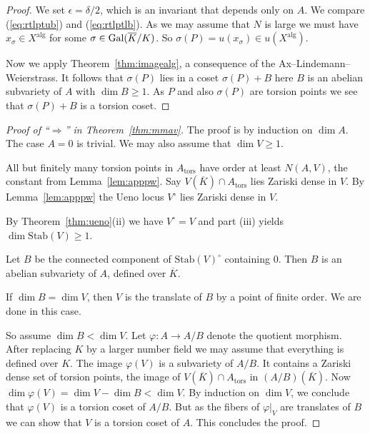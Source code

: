 \begin{proof}
  We set $\epsilon = \delta/2$, which is an invariant that depends only
  on $A$. We compare (\ref{eq:rtlptub}) and (\ref{eq:rtlptlb}). As we
  may assume that $N$ is large we must have $x_\sigma \in
  X^{\mathrm{alg}}$ for some $\sigma\in \mathrm{Gal}(\overline{K}/K)$. 
  So $\sigma(P) = u(x_\sigma)  \in u(X^{\mathrm{alg}})$.

  Now we apply Theorem~\ref{thm:imagealg}, a consequence of the
  Ax--Lindemann--Weierstrass. It follows that $\sigma(P)$ lies in a
  coset $\sigma(P)+B$ here $B$ is an abelian subvariety of $A$ with
  $\dim B\ge 1$. As $P$ and also $\sigma(P)$ are torsion points we see
  that $\sigma(P)+B$ is a torsion coset.
\end{proof}


\begin{proof}[Proof of ``$\Longrightarrow$'' in
  Theorem~\ref{thm:mmav}]
  The proof is by induction on $\dim A$. The case $A=0$ is trivial. 
  We may also assume that $\dim V\ge 1$.

  All but finitely many torsion
  points in $A_{\mathrm{tors}}$ have order at least $N(A,V)$, the
  constant from Lemma~\ref{lem:apppw}.
  Say $V(\overline K)\cap A_{\mathrm{tors}}$ lies Zariski dense in
  $V$. By Lemma~\ref{lem:apppw} 
  the Ueno locus $V^{\circ}$ lies Zariski dense in $V$.

  By Theorem~\ref{thm:ueno}(ii) we have $V^{\circ}=V$ and part (iii)
  yields $\dim \mathrm{Stab}(V) \ge 1$.

  Let $B$ be the connected component of $\mathrm{Stab}(V)^{\circ}$
  containing $0$. Then $B$ is an abelian subvariety of $A$, defined
  over $\overline K$.

  If $\dim B = \dim V$, then $V$ is the translate of $B$ by  a point
  of finite order. We are done in this case.
  
  So assume $\dim B<\dim V$. 
  Let $\varphi\colon A\rightarrow A/B$ denote the quotient morphism.
  After replacing $K$ by a larger number field we may assume that
  everything is defined over $K$.
  The image $\varphi(V)$ is a subvariety of $A/B$. It contains a
  Zariski dense set of torsion points, the image of $V(\overline
  K)\cap A_{\mathrm{tors}}$ in $(A/B)(\overline K)$.
  Now $\dim \varphi(V) = \dim V-\dim B<\dim V$. By induction on $\dim V$,
  we conclude that $\varphi(V)$ is a torsion coset of $A/B$.
  But as the fibers of $\varphi|_V$ are translates of $B$ we can show 
  that $V$ is a torsion coset of $A$. This concludes the proof. 
\end{proof}

